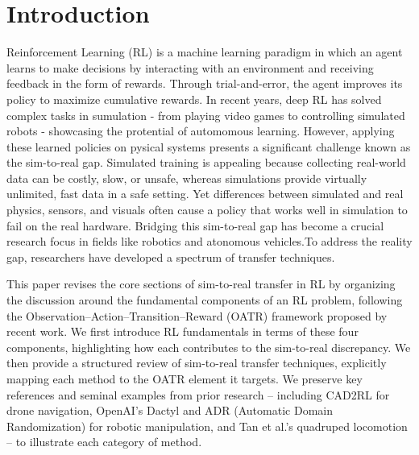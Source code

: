 \section{Introduction}
Reinforcement Learning (RL) is a machine learning paradigm in which an agent learns to make decisions by interacting with an environment and receiving feedback in the form of rewards. Through trial-and-error, the agent improves its policy to maximize cumulative rewards. In recent years, deep RL has solved complex tasks in sumulation - from playing video games to controlling simulated robots - showcasing the protential of automomous learning. However, applying these learned policies on pysical systems presents a significant challenge known as the sim-to-real gap. Simulated training is appealing because collecting real-world data can be costly, slow, or unsafe, whereas simulations provide virtually unlimited, fast data in a safe setting. Yet differences between simulated and real physics, sensors, and visuals often cause a policy that works well in simulation to fail on the real hardware. Bridging this sim-to-real gap has become a crucial research focus in fields like robotics and atonomous vehicles.To address the reality gap, researchers have developed a spectrum of transfer techniques.

This paper revises the core sections of sim-to-real transfer in RL by organizing the discussion around the fundamental components of an RL problem, following the Observation–Action–Transition–Reward (OATR) framework proposed by recent work. We first introduce RL fundamentals in terms of these four components, highlighting how each contributes to the sim-to-real discrepancy. We then provide a structured review of sim-to-real transfer techniques, explicitly mapping each method to the OATR element it targets. We preserve key references and seminal examples from prior research – including CAD2RL for drone navigation, OpenAI’s Dactyl and ADR (Automatic Domain Randomization) for robotic manipulation, and Tan et al.’s quadruped locomotion – to illustrate each category of method.